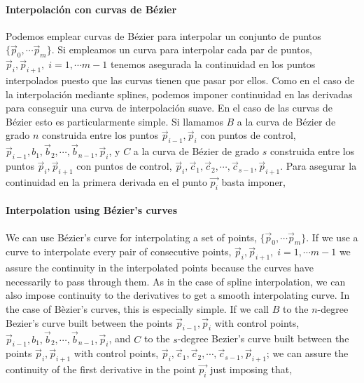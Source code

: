 \begin{paracol}{2}
\paragraph{Interpolación con curvas de Bézier} Podemos emplear curvas de Bézier para interpolar un conjunto de puntos $\lbrace \vec{p}_0, \cdots  \vec{p}_m\rbrace$. Si empleamos un curva para interpolar cada par de puntos, $\vec{p}_i, \vec{p}_{i+1}, \; i =1, \cdots m-1$ tenemos asegurada la continuidad en los puntos interpolados puesto que las curvas tienen que pasar por ellos. Como en el caso de la interpolación mediante splines, podemos imponer continuidad en las derivadas para conseguir una curva de interpolación suave. En el caso de las curvas de Bézier esto es particularmente simple. Si llamamos $B$ a la curva de Bézier de grado $n$ construida entre los puntos $\vec{p}_{i-1}, \vec{p}_{i}$  con puntos de control, $\vec{p}_{i-1}, b_1, \vec{b}_2,\cdots, \vec{b}_{n-1},\vec{p}_{i}$, y  $C$ a la curva de Bézier de grado $s$ construida entre los puntos $\vec{p}_{i}, \vec{p}_{i+1}$  con puntos de control, $\vec{p}_{i}, \vec{c}_1, \vec{c}_2,\cdots, \vec{c}_{s-1},\vec{p}_{i+1}$. Para asegurar la continuidad en la primera derivada en el punto $\vec{p_i}$ basta imponer,

\switchcolumn
\paragraph{Interpolation using Bézier's curves} We can use Bézier's curve for interpolating a set of points, $\lbrace \vec{p}_0, \cdots  \vec{p}_m\rbrace$. If we use a curve to interpolate every pair of consecutive points, $\vec{p}_i, \vec{p}_{i+1}, \; i =1, \cdots m-1$ we assure the continuity in the interpolated points because the curves have necessarily to pass through them. As in the case of spline interpolation, we can also impose continuity to the derivatives to get a smooth interpolating curve. In the case of Bèzier's curves, this is especially simple. If we call $B$ to the $n$-degree Bezier's curve built between the points $\vec{p}_{i-1}, \vec{p}_{i}$  with control points, $\vec{p}_{i-1}, b_1, \vec{b}_2,\cdots, \vec{b}_{n-1},\vec{p}_{i}$, and $C$ to the $s$-degree Bezier's curve built between the points $\vec{p}_{i}, \vec{p}_{i+1}$  with control points, $\vec{p}_{i}, \vec{c}_1, \vec{c}_2,\cdots, \vec{c}_{s-1},\vec{p}_{i+1}$; we can assure the continuity of the first derivative in the point $\vec{p_i}$ just imposing that,   
\end{paracol}
